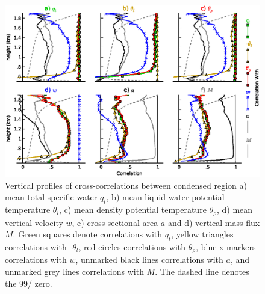 \documentclass[acp]{copernicus}
\begin{document}
\begin{figure}[t]
\vspace*{2mm}
\begin{center}
\includegraphics[width=\textwidth]{./figures/cloud_autocorrelation}
\end{center}
\caption{Vertical profiles of cross-correlations between condensed region 
a) mean total specific water $q_t$, b) mean liquid-water potential 
temperature $\theta_l$, c) mean density potential temperature $\theta_\rho$, 
d) mean vertical velocity $w$, e) cross-sectional area $a$ and d) vertical mass 
flux $M$.  Green squares denote correlations with $q_t$, yellow triangles 
correlations with -$\theta_l$, red circles correlations with $\theta_\rho$, 
blue x markers correlations with $w$, unmarked black lines correlations with 
$a$, and unmarked grey lines correlations with $M$. The dashed line denotes the 
99/%
zero.}
\label{fig:cloud_autocorrelation}
\end{figure}
\end{document}
